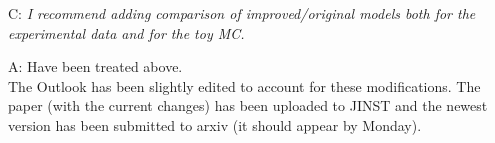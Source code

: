 \documentclass[a4paper,11pt]{article}
\begin{document}
C: \emph{I recommend adding comparison of improved/original models both for the experimental data and for the toy MC.}

A: Have been treated above.
\\[1ex]

The Outlook has been slightly edited to account for these modifications. 
The paper (with the current changes) has been uploaded to JINST and the newest version has been submitted to arxiv (it should appear by Monday).
\end{document}
